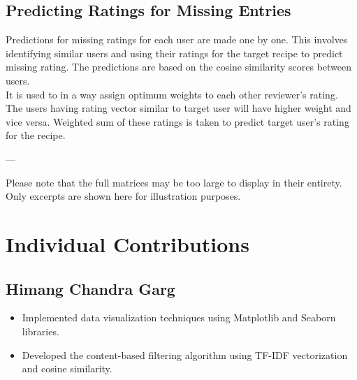 \documentclass[conference]{IEEEtran}
\begin{document}
\begin{table}[H]
\centering
{}
\caption{Cosine Similarity Matrix (excerpt)}
\label{tab:cosine_similarity_matrix}
\end{table}

\subsection{Predicting Ratings for Missing Entries}

Predictions for missing ratings for each user are made one by one. This involves identifying similar users and using their ratings for the target recipe to predict missing rating. The predictions are based on the cosine similarity scores between users. 
\\
It is used to in a way assign optimum weights to each other reviewer's rating. The users having rating vector similar to target user will have higher weight and vice versa. Weighted sum of these ratings is taken to predict target user's rating for the recipe.

---

Please note that the full matrices may be too large to display in their entirety. Only excerpts are shown here for illustration purposes.

\section{Individual Contributions}
\subsection{Himang Chandra Garg}
\begin{itemize}
    \item Implemented data visualization techniques using Matplotlib and Seaborn libraries.
    \item Developed the content-based filtering algorithm using TF-IDF vectorization and cosine similarity.
\end{itemize}
\end{document}
